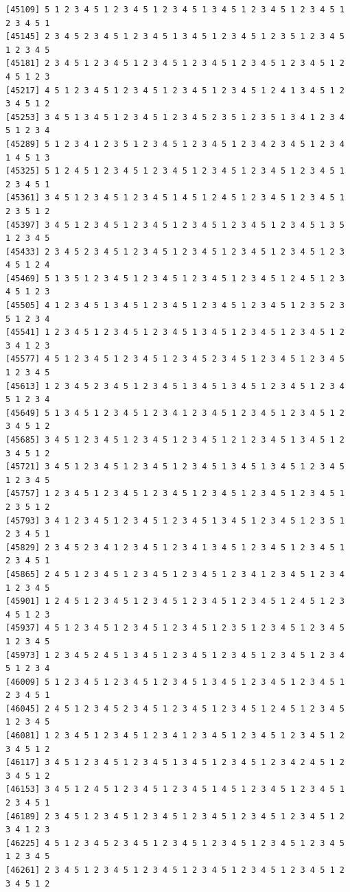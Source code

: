 \documentclass[
  11pt,
]{book}
\begin{document}
\begin{verbatim}
[45109] 5 1 2 3 4 5 1 2 3 4 5 1 2 3 4 5 1 3 4 5 1 2 3 4 5 1 2 3 4 5 1 2 3 4 5 1
[45145] 2 3 4 5 2 3 4 5 1 2 3 4 5 1 3 4 5 1 2 3 4 5 1 2 3 5 1 2 3 4 5 1 2 3 4 5
[45181] 2 3 4 5 1 2 3 4 5 1 2 3 4 5 1 2 3 4 5 1 2 3 4 5 1 2 3 4 5 1 2 4 5 1 2 3
[45217] 4 5 1 2 3 4 5 1 2 3 4 5 1 2 3 4 5 1 2 3 4 5 1 2 4 1 3 4 5 1 2 3 4 5 1 2
[45253] 3 4 5 1 3 4 5 1 2 3 4 5 1 2 3 4 5 2 3 5 1 2 3 5 1 3 4 1 2 3 4 5 1 2 3 4
[45289] 5 1 2 3 4 1 2 3 5 1 2 3 4 5 1 2 3 4 5 1 2 3 4 2 3 4 5 1 2 3 4 1 4 5 1 3
[45325] 5 1 2 4 5 1 2 3 4 5 1 2 3 4 5 1 2 3 4 5 1 2 3 4 5 1 2 3 4 5 1 2 3 4 5 1
[45361] 3 4 5 1 2 3 4 5 1 2 3 4 5 1 4 5 1 2 4 5 1 2 3 4 5 1 2 3 4 5 1 2 3 5 1 2
[45397] 3 4 5 1 2 3 4 5 1 2 3 4 5 1 2 3 4 5 1 2 3 4 5 1 2 3 4 5 1 3 5 1 2 3 4 5
[45433] 2 3 4 5 2 3 4 5 1 2 3 4 5 1 2 3 4 5 1 2 3 4 5 1 2 3 4 5 1 2 3 4 5 1 2 4
[45469] 5 1 3 5 1 2 3 4 5 1 2 3 4 5 1 2 3 4 5 1 2 3 4 5 1 2 4 5 1 2 3 4 5 1 2 3
[45505] 4 1 2 3 4 5 1 3 4 5 1 2 3 4 5 1 2 3 4 5 1 2 3 4 5 1 2 3 5 2 3 5 1 2 3 4
[45541] 1 2 3 4 5 1 2 3 4 5 1 2 3 4 5 1 3 4 5 1 2 3 4 5 1 2 3 4 5 1 2 3 4 1 2 3
[45577] 4 5 1 2 3 4 5 1 2 3 4 5 1 2 3 4 5 2 3 4 5 1 2 3 4 5 1 2 3 4 5 1 2 3 4 5
[45613] 1 2 3 4 5 2 3 4 5 1 2 3 4 5 1 3 4 5 1 3 4 5 1 2 3 4 5 1 2 3 4 5 1 2 3 4
[45649] 5 1 3 4 5 1 2 3 4 5 1 2 3 4 1 2 3 4 5 1 2 3 4 5 1 2 3 4 5 1 2 3 4 5 1 2
[45685] 3 4 5 1 2 3 4 5 1 2 3 4 5 1 2 3 4 5 1 2 1 2 3 4 5 1 3 4 5 1 2 3 4 5 1 2
[45721] 3 4 5 1 2 3 4 5 1 2 3 4 5 1 2 3 4 5 1 3 4 5 1 3 4 5 1 2 3 4 5 1 2 3 4 5
[45757] 1 2 3 4 5 1 2 3 4 5 1 2 3 4 5 1 2 3 4 5 1 2 3 4 5 1 2 3 4 5 1 2 3 5 1 2
[45793] 3 4 1 2 3 4 5 1 2 3 4 5 1 2 3 4 5 1 3 4 5 1 2 3 4 5 1 2 3 5 1 2 3 4 5 1
[45829] 2 3 4 5 2 3 4 1 2 3 4 5 1 2 3 4 1 3 4 5 1 2 3 4 5 1 2 3 4 5 1 2 3 4 5 1
[45865] 2 4 5 1 2 3 4 5 1 2 3 4 5 1 2 3 4 5 1 2 3 4 1 2 3 4 5 1 2 3 4 1 2 3 4 5
[45901] 1 2 4 5 1 2 3 4 5 1 2 3 4 5 1 2 3 4 5 1 2 3 4 5 1 2 4 5 1 2 3 4 5 1 2 3
[45937] 4 5 1 2 3 4 5 1 2 3 4 5 1 2 3 4 5 1 2 3 5 1 2 3 4 5 1 2 3 4 5 1 2 3 4 5
[45973] 1 2 3 4 5 2 4 5 1 3 4 5 1 2 3 4 5 1 2 3 4 5 1 2 3 4 5 1 2 3 4 5 1 2 3 4
[46009] 5 1 2 3 4 5 1 2 3 4 5 1 2 3 4 5 1 3 4 5 1 2 3 4 5 1 2 3 4 5 1 2 3 4 5 1
[46045] 2 4 5 1 2 3 4 5 2 3 4 5 1 2 3 4 5 1 2 3 4 5 1 2 4 5 1 2 3 4 5 1 2 3 4 5
[46081] 1 2 3 4 5 1 2 3 4 5 1 2 3 4 1 2 3 4 5 1 2 3 4 5 1 2 3 4 5 1 2 3 4 5 1 2
[46117] 3 4 5 1 2 3 4 5 1 2 3 4 5 1 3 4 5 1 2 3 4 5 1 2 3 4 2 4 5 1 2 3 4 5 1 2
[46153] 3 4 5 1 2 4 5 1 2 3 4 5 1 2 3 4 5 1 4 5 1 2 3 4 5 1 2 3 4 5 1 2 3 4 5 1
[46189] 2 3 4 5 1 2 3 4 5 1 2 3 4 5 1 2 3 4 5 1 2 3 4 5 1 2 3 4 5 1 2 3 4 1 2 3
[46225] 4 5 1 2 3 4 5 2 3 4 5 1 2 3 4 5 1 2 3 4 5 1 2 3 4 5 1 2 3 4 5 1 2 3 4 5
[46261] 2 3 4 5 1 2 3 4 5 1 2 3 4 5 1 2 3 4 5 1 2 3 4 5 1 2 3 4 5 1 2 3 4 5 1 2

\end{verbatim}
\end{document}
